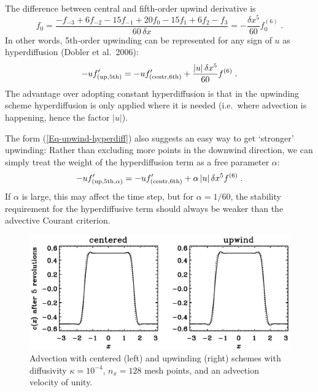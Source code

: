 \documentclass[\mydriver,12pt,twoside,notitlepage,a4paper]{article}
\begin{document}
The difference between central and fifth-order upwind derivative is
\begin{equation}
  [D^{\rm(up,5)} - D^{\rm(cent,6)}] f_0
  = \frac{-f_{-3} + 6 f_{-2} - 15 f_{-1} + 20 f_{0}
          - 15 f_{1} + 6 f_{2} - f_{3}}
         {60\,\delta x}
  = -\frac{\delta x^5}{60} f^{(6)}_{0} \; .
\end{equation}
In other words, 5th-order upwinding can be represented for any sign of $u$
as hyperdiffusion (Dobler et al.\ 2006): 
\begin{equation} \label{Eq-upwind-hyperdiff}
  -u f'_{\rm(up,5th)}
  = -u f'_{\rm(centr,6th)}  + \frac{|u|\,\delta x^5}{60} f^{(6)} \; .
\end{equation}
The advantage over adopting constant hyperdiffusion is that in the
upwinding scheme hyperdiffusion is only applied where it is needed
(i.e.~where advection is happening, hence the factor $|u|$).

The form (\ref{Eq-upwind-hyperdiff}) also suggests an easy way to get
`stronger' upwinding: Rather than excluding more points in the downwind
direction, we can simply treat the weight of the hyperdiffusion term as a
free parameter $\alpha$:
\begin{equation}
  -u f'_{\rm(up,5th,\alpha)}
  = -u f'_{\rm(centr,6th)}  + \alpha\,|u|\,\delta x^5 f^{(6)} \; .
\end{equation}
If $\alpha$ is large, this may affect the time step, but for
$\alpha=1/60$, the stability requirement for the hyperdiffusive term
should always be weaker than the advective Courant criterion.

\begin{figure}[h!]\begin{center}
\includegraphics[width=.8\columnwidth]{pw}
\end{center}\caption[]{
  Advection with centered (left) and upwinding (right)
  schemes with diffusivity $\kappa=10^{-4}$,
  $n_x=128$ mesh points,
  and an advection velocity of unity.
}\label{pw}\end{figure}
\end{document}
